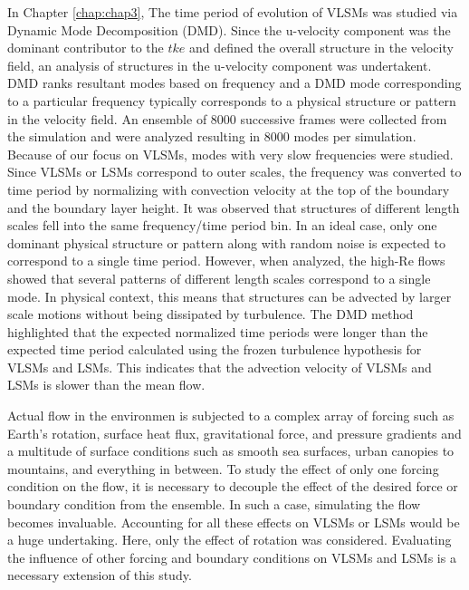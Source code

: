 In Chapter \ref{chap:chap3}, The time period of evolution of VLSMs was studied via Dynamic Mode Decomposition (DMD). Since the u-velocity component was the dominant contributor to the $tke$ and defined the overall structure in the velocity field,  an analysis of structures in the u-velocity component was undertakent. DMD ranks resultant modes based on frequency and a DMD mode corresponding to a particular frequency typically corresponds to a physical structure or pattern in the velocity field. An ensemble of 8000 successive frames were collected from the simulation and were analyzed resulting in 8000 modes per simulation. Because of our focus on VLSMs, modes with very slow frequencies were studied. Since VLSMs or LSMs correspond to outer scales, the frequency was converted to time period by normalizing with convection velocity at the top of the boundary and the boundary layer height. It was observed that structures of different length scales fell into the same frequency/time period bin. In an ideal case, only one dominant physical structure or pattern along with random noise is expected to correspond to a single time period. However, when analyzed, the high-Re flows showed that several patterns of different length scales correspond to a single mode. In physical context, this means that structures can be advected by larger scale motions without being dissipated by turbulence. The DMD method highlighted that the expected normalized time periods were longer than the expected time period calculated using the frozen turbulence hypothesis for VLSMs and LSMs. This indicates that the advection velocity of VLSMs and LSMs is slower than the mean flow. 

Actual flow in the environmen is subjected to a complex array of forcing such as Earth's rotation, surface heat flux, gravitational force, and pressure gradients and a multitude of surface conditions such as smooth sea surfaces, urban canopies to mountains, and everything in between. To study the effect of only one forcing condition on the flow, it is necessary to decouple the effect of the desired force or boundary condition from the ensemble. In such a case, simulating the flow becomes invaluable. Accounting for all these effects on VLSMs or LSMs would be a huge undertaking. Here, only the effect of rotation was considered. Evaluating the influence of other forcing and boundary conditions on VLSMs and LSMs is a necessary extension of this study. 


